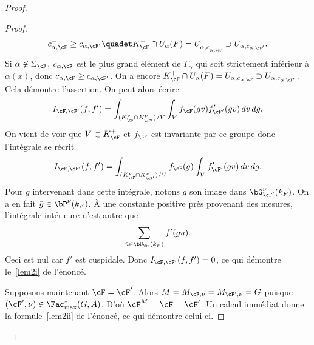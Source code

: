 \begin{proof}
\begin{proof}
\[
c_{\alpha,\cF}^-\geq c_{\alpha,\cF'}\quadet K_{\cF}^+\cap U_{\alpha}(F)=U_{\alpha,c_{\alpha,\cF}^-}\supset U_{\alpha,c_{\alpha,\cF'}}.
\]
Si $\alpha\not\in \Sigma_{\cF}$, $c_{\alpha,\cF}$ est le plus grand élément de $\Gamma_{\alpha}$ qui soit strictement inférieur à $\alpha(x)$, donc $c_{\alpha,\cF}\geq c_{\alpha,\cF'}$. On a encore $K_{\cF}^+\cap U_{\alpha}(F)=U_{\alpha,c_{\alpha,\cF}}\supset U_{\alpha,c_{\alpha,\cF'}}$. Cela démontre l'assertion. On peut alors écrire
\[
I_{\cF,\cF'}(f,f')=\int_{(K_{\cF}^{\nu}\cap K_{\cF'}^{\nu})/V}\int_{V}f_{\cF}(gv)f'_{\cF'}(gv)\, dv\, dg.
\]
On vient de voir que $V\subset K_{\cF}^+$ et $f_{\cF}$ est invariante par ce groupe donc l'intégrale se récrit
\[
I_{\cF,\cF'}(f,f')=\int_{(K_{\cF}^{\nu}\cap K_{\cF'}^{\nu})/V}f_{\cF}(g)\int_{V}f'_{\cF'}(gv)\, dv\, dg.
\]
Pour $g$ intervenant dans cette intégrale, notons $\bar{g}$ son image dans $\bG^{\nu}_{\cF'}(k_{F})$. On a en fait $\bar{g}\in \bP^{\nu}(k_{F})$. À une constante positive près provenant des mesures, l'intégrale intérieure n'est autre que
\[
\sum_{\bar{u}\in \bU_{\bP}(k_{F})}f'(\bar{g}\bar{ u}).
\]
Ceci est nul car $f'$ est cuspidale. Donc $I_{\cF,\cF'}(f,f')=0$, ce qui démontre le~\eqref{lem2i} de l'énoncé.

Supposons maintenant $\cF=\cF'$. Alors $M=M_{\cF,\nu}=M_{\cF',\nu}=G$ puisque $(\cF',\nu)\in \Fac^*_{\max}(G,A)$. D'où $\cF^M=\cF=\cF'$. Un calcul immédiat donne
la formule~\eqref{lem2ii} de l'énoncé, ce qui démontre celui-ci.
\end{proof}


\end{proof}
